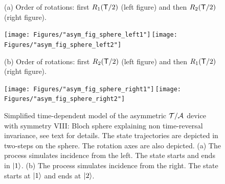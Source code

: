 \begin{figure}
  (a) Order of rotations:  first  $R_1({\sf T}/2)$ (left figure) and then $R_2({\sf T}/2)$ (right figure).
  \begin{center}
  \texttt{[image: Figures/"asym\_fig\_sphere\_left1"]}\,\texttt{[image: Figures/"asym\_fig\_sphere\_left2"]}\\[0.1cm]
  \end{center}
  (b) Order of rotations: first $R_2({\sf T}/2)$ (left figure) and then $R_1({\sf T}/2)$ (right figure).
  \begin{center}
  \texttt{[image: Figures/"asym\_fig\_sphere\_right1"]}\,\texttt{[image: Figures/"asym\_fig\_sphere\_right2"]}
  \end{center}
  \vspace*{-.8cm}
  \caption{Simplified time-dependent model of the asymmetric ${\cal T/A}$ device with symmetry VIII: Bloch sphere explaining non time-reversal invariance, see text for details. The state trajectories are depicted in two-steps on the sphere. The rotation axes are
  also depicted. (a) The process simulates incidence from the left. The state starts and ends in $|1\rangle$. (b) The process simulates incidence from the right. The state starts at $|1\rangle$ and ends at $|2\rangle$.
  \label{fig_t_a_simple2}}
\end{figure}


